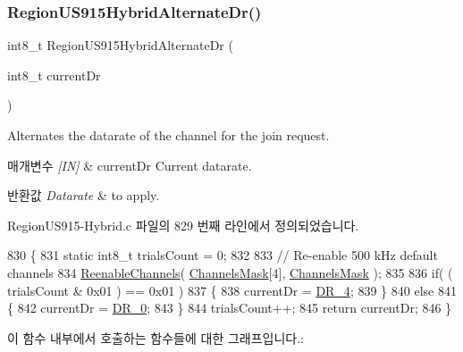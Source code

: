 \subsubsection{\texorpdfstring{Region\+U\+S915\+Hybrid\+Alternate\+Dr()}{RegionUS915HybridAlternateDr()}}
{\footnotesize\ttfamily int8\+\_\+t Region\+U\+S915\+Hybrid\+Alternate\+Dr (\begin{DoxyParamCaption}\item[{int8\+\_\+t}]{current\+Dr }\end{DoxyParamCaption})}



Alternates the datarate of the channel for the join request. 


\begin{DoxyParams}{매개변수}
{\em \mbox{[}\+I\+N\mbox{]}} & current\+Dr Current datarate.\\
\hline
\end{DoxyParams}

\begin{DoxyRetVals}{반환값}
{\em Datarate} & to apply. \\
\hline
\end{DoxyRetVals}


Region\+U\+S915-\/\+Hybrid.\+c 파일의 829 번째 라인에서 정의되었습니다.


\begin{DoxyCode}
830 \{
831     \textcolor{keyword}{static} int8\_t trialsCount = 0;
832 
833     \textcolor{comment}{// Re-enable 500 kHz default channels}
834     \mbox{\hyperlink{_region_u_s915-_hybrid_8c_ac8aa2da46dca1566e730ffda2650f947}{ReenableChannels}}( \mbox{\hyperlink{_region_u_s915-_hybrid_8c_a2188957b5ca6af8092154d7ccbfa5757}{ChannelsMask}}[4], \mbox{\hyperlink{_region_u_s915-_hybrid_8c_a2188957b5ca6af8092154d7ccbfa5757}{ChannelsMask}} );
835 
836     \textcolor{keywordflow}{if}( ( trialsCount & 0x01 ) == 0x01 )
837     \{
838         currentDr = \mbox{\hyperlink{group___r_e_g_i_o_n_ga6ceba6158a7dab238e9d0b846fb47a0c}{DR\_4}};
839     \}
840     \textcolor{keywordflow}{else}
841     \{
842         currentDr = \mbox{\hyperlink{group___r_e_g_i_o_n_ga6c4ef966b4f3d5eb7597b087f2b97095}{DR\_0}};
843     \}
844     trialsCount++;
845     \textcolor{keywordflow}{return} currentDr;
846 \}
\end{DoxyCode}
이 함수 내부에서 호출하는 함수들에 대한 그래프입니다.\+:
\mbox{\label{group___r_e_g_i_o_n_u_s915_h_y_b_gadf2edbcb9c0e296e8de9fe4a40fc96ee}} 
